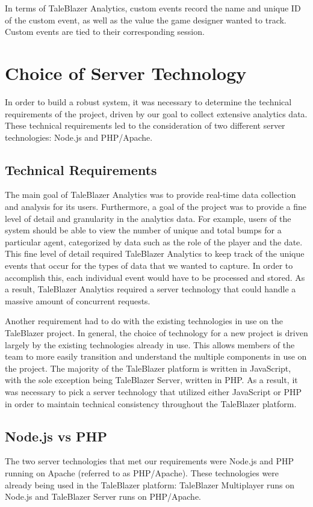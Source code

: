 In terms of TaleBlazer Analytics, custom events record the name and unique ID of the custom event, as well as the value the game designer wanted to track. Custom events are tied to their corresponding session.

\section{Choice of Server Technology}
In order to build a robust system, it was necessary to determine the technical requirements of the project, driven by our goal to collect extensive analytics data. These technical requirements led to the consideration of two different server technologies: Node.js and PHP/Apache. 

\subsection{Technical Requirements}

The main goal of TaleBlazer Analytics was to provide real-time data collection and analysis for its users. Furthermore, a goal of the project was to provide a fine level of detail and granularity in the analytics data. For example, users of the system should be able to view the number of unique and total bumps for a particular agent, categorized by data such as the role of the player and the date. This fine level of detail required TaleBlazer Analytics to keep track of the unique events that occur for the types of data that we wanted to capture. In order to accomplish this, each individual event would have to be processed and stored. As a result, TaleBlazer Analytics required a server technology that could handle a massive amount of concurrent requests. 	

Another requirement had to do with the existing technologies in use on the TaleBlazer project. In general, the choice of technology for a new project is driven largely by the existing technologies already in use. This allows members of the team to more easily transition and understand the multiple components in use on the project. The majority of the TaleBlazer platform is written in JavaScript, with the sole exception being TaleBlazer Server, written in PHP. As a result, it was necessary to pick a server technology that utilized either JavaScript or PHP in order to maintain technical consistency throughout the TaleBlazer platform. 

\subsection{Node.js vs PHP}
The two server technologies that met our requirements were Node.js and PHP running on Apache (referred to as PHP/Apache). These technologies were already being used in the TaleBlazer platform: TaleBlazer Multiplayer runs on Node.js and TaleBlazer Server runs on PHP/Apache. 

